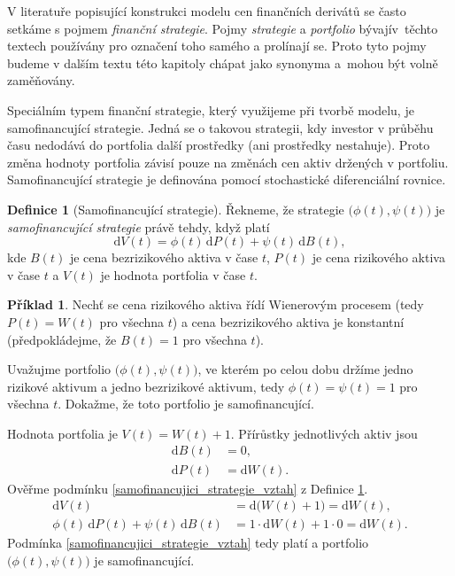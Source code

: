 \documentclass[a4paper,12pt]{report}
\theoremstyle{definition} \newtheorem{definice}[veta]{Definice}
\newtheorem{priklad}{Příklad}
\theoremstyle{remark}
\begin{document}
V literatuře popisující konstrukci modelu cen finančních derivátů se často setkáme s pojmem \textit{finanční strategie}.
Pojmy \textit{strategie} a \textit{portfolio} bývají\linebreak v~těchto textech používány pro označení toho samého a prolínají se.
Proto tyto pojmy budeme v dalším textu této kapitoly chápat jako synonyma a~mohou být volně zaměňovány.

Speciálním typem finanční strategie, který využijeme při tvorbě modelu, je samofinancující strategie.
Jedná se o takovou strategii, kdy investor v průběhu času nedodává do portfolia další prostředky (ani prostředky nestahuje).
Proto změna hodnoty portfolia závisí pouze na změnách cen aktiv držených v portfoliu. 
Samofinancující strategie je definována pomocí stochastické diferenciální rovnice.
\begin{definice}[Samofinancující strategie]\label{samofinancujici_strategie}
Řekneme, že strategie $\big(\phi(t),\psi(t)\big)$ je \textit{samofinancující strategie} právě tehdy, když platí
\begin{equation}\label{samofinancujici_strategie_vztah}
\mathrm{d}V(t)=\phi(t)\,\mathrm{d}P(t)+\psi(t)\,\mathrm{d}B(t),
\end{equation}
kde $B(t)$ je cena bezrizikového aktiva v čase $t$, $P(t)$ je cena rizikového aktiva v čase $t$ a $V(t)$ je hodnota portfolia v čase $t$.
\end{definice}

\begin{priklad}\label{samofinancujici_portfolio_priklad}
Nechť se cena rizikového aktiva řídí Wienerovým procesem (tedy $P(t)=W(t)$ pro všechna $t$) a cena bezrizikového aktiva je konstantní (předpokládejme, že $B(t)=1$ pro všechna $t$).

Uvažujme portfolio $\big(\phi(t),\psi(t)\big)$, ve kterém po celou dobu držíme jedno rizikové aktivum a jedno bezrizikové aktivum, tedy $\phi(t)=\psi(t)=1$ pro všechna $t$. 
Dokažme, že toto portfolio je samofinancující.

Hodnota portfolia je $V(t)=W(t)+1$.
Přírůstky jednotlivých aktiv jsou
\begin{align*}
\mathrm{d}B(t)&= 0, \\
\mathrm{d}P(t)&=\mathrm{d}W(t). 
\end{align*}
Ověřme podmínku \eqref{samofinancujici_strategie_vztah} z Definice \ref{samofinancujici_strategie}.
\begin{align*}
\mathrm{d}V(t)&=\mathrm{d}\big(W(t)+1\big)=\mathrm{d}W(t),\\
\phi(t)\,\mathrm{d}P(t)+\psi(t)\,\mathrm{d}B(t)&=1\cdot\mathrm{d}W(t)+1\cdot0=\mathrm{d}W(t).
\end{align*}
Podmínka \eqref{samofinancujici_strategie_vztah} tedy platí a portfolio $\big(\phi(t),\psi(t)\big)$ je samofinancující.
\end{priklad}
\end{document}
